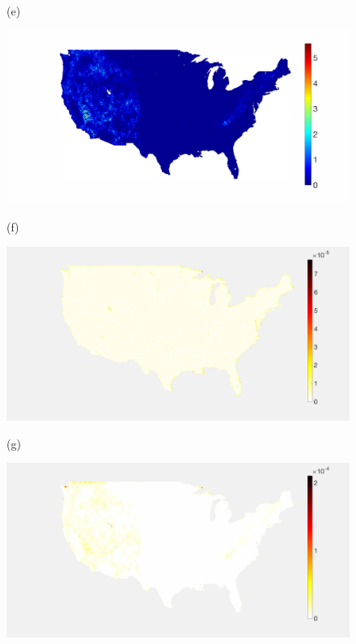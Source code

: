 \documentclass[journal, 10pt]{IEEEtran}
\begin{document}
\begin{figure}[tb]
\begin{minipage}[m]{0.24\linewidth}
\centerline{\small{(e)}}
\end{minipage}
\begin{minipage}[m]{0.24\linewidth}
\centerline{\includegraphics[width=.9\linewidth]{fig_temp_band2_coeffs}}
\centerline{\small{(f)}}
\end{minipage} %
\begin{minipage}[m]{0.24\linewidth}
\centerline{\includegraphics[width=.85\linewidth]{fig_temp_sampling2}}
\centerline{\small{(g)}}
\end{minipage}
\begin{minipage}[m]{0.24\linewidth}
\centerline{\includegraphics[width=.84\linewidth]{fig_temp_sampling2_adapted}}

\end{minipage}
\end{figure}
\end{document}

